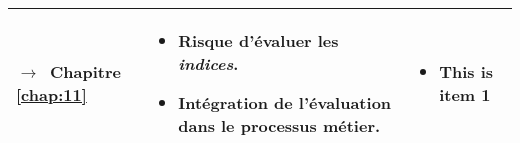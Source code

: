\begin{tabular}{L{.2\textheight}L{.35\textheight}L{.35\textheight}}
{\par\footnotesize\hspace{.25cm}$\longrightarrow$~Chapitre
\ref{chap:11}} & \begin{minipage}{.35\textheight} \small
    \begin{itemize}
    \item Risque d'évaluer les \emph{indices}.
    \item Intégration de l'évaluation dans le processus métier.
    \end{itemize}
  \end{minipage}& \begin{minipage}{.35\textheight}
    \begin{itemize}
    \item This is item 1
    \end{itemize}
  \end{minipage}\\
  
  \bottomrule
\end{tabular}
